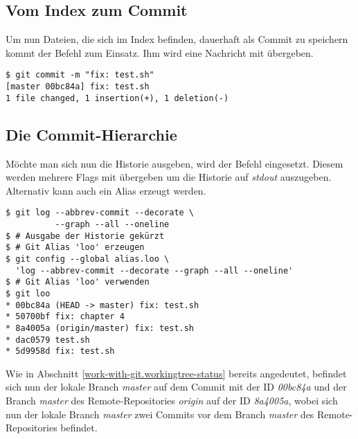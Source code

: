 \subsection{Vom Index zum Commit}
\label{work-with-git.index-to-commit}
Um nun Dateien, die sich im Index befinden, dauerhaft als Commit zu speichern kommt der Befehl \textit{} zum Einsatz. Ihm wird eine Nachricht mit übergeben.

\begin{verbatim}
$ git commit -m "fix: test.sh"
[master 00bc84a] fix: test.sh
1 file changed, 1 insertion(+), 1 deletion(-)
\end{verbatim}

\subsection{Die Commit-Hierarchie}
Möchte man sich nun die Historie ausgeben, wird der Befehl  \textit{} eingesetzt. Diesem werden mehrere Flags mit übergeben um die Historie auf \textit{stdout} auszugeben. Alternativ kann auch ein Alias erzeugt werden.

\begin{verbatim}
$ git log --abbrev-commit --decorate \
          --graph --all --oneline
$ # Ausgabe der Historie gekürzt
$ # Git Alias 'loo' erzeugen
$ git config --global alias.loo \ 
  'log --abbrev-commit --decorate --graph --all --oneline'
$ # Git Alias 'loo' verwenden
$ git loo
* 00bc84a (HEAD -> master) fix: test.sh
* 50700bf fix: chapter 4
* 8a4005a (origin/master) fix: test.sh
* dac0579 test.sh
* 5d9958d fix: test.sh
\end{verbatim}

Wie in Abschnitt \ref{work-with-git.workingtree-status} bereits angedeutet, befindet sich nun der lokale Branch \textit{master} auf dem Commit mit der ID \textit{00bc84a} und der Branch \textit{master} des Remote-Repositories \textit{origin} auf der ID \textit{8a4005a}, wobei sich nun der lokale Branch \textit{master} zwei Commits vor dem Branch \textit{master} des Remote-Repositories befindet.